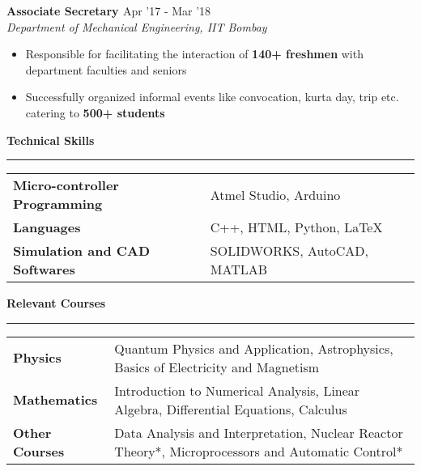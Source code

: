 \documentclass[8pt]{article}%
\begin{document}
{\begin{itemize}
\end{itemize}
 {\flushleft \bf \large{Associate Secretary }}  \hfill {{{Apr '17 - Mar '18} }} \\
 {\em Department of Mechanical Engineering, IIT Bombay}
\begin{itemize}
    \setlength\itemsep{0.01em}
    \item Responsible for facilitating the interaction of {\bf 140+ freshmen} with department faculties and seniors
    \item Successfully organized informal events like convocation, kurta day, trip etc. catering to {\bf 500+ students}
\end{itemize}


\begin{flushleft}
\bf{\Large{Technical Skills}}
\end{flushleft}
\vspace{-1mm}

\hrule
\vspace{1mm}
\begin{tabular}{l l}

\textbf{Micro-controller Programming} & Atmel Studio, Arduino \vspace{4pt}\\
\textbf{Languages} & C++, HTML, Python, \LaTeX  \vspace{4pt}\\

\textbf{Simulation and CAD Softwares} & SOLIDWORKS, AutoCAD, MATLAB 
	
\end{tabular}
\vspace{-4pt}

\begin{flushleft}
\bf{\Large{Relevant Courses}}
\end{flushleft}
\vspace{-1mm}
\hrule
\vspace{2mm}
\begin{tabular}{l l}

\textbf{Physics} & Quantum Physics and Application, Astrophysics, Basics of Electricity and Magnetism  \vspace{4pt}\\
\textbf{Mathematics} & Introduction to Numerical Analysis, Linear Algebra, Differential Equations, Calculus  \vspace{4pt}\\
\textbf{Other Courses} & Data Analysis and Interpretation, Nuclear Reactor Theory*, Microprocessors and Automatic Control*
	

\end{tabular}}
\end{document}
